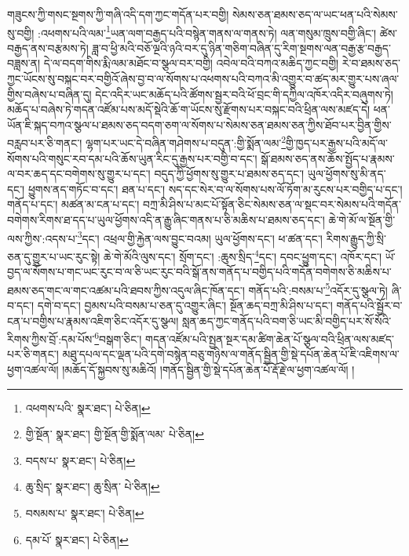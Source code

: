 གཟུངས་ཀྱི་གསང་སྔགས་ཀྱི་གཞི་འདི་དག་ཀྱང་གདོན་པར་བགྱི། སེམས་ཅན་ཐམས་ཅད་ལ་ཡང་ཕན་པའི་སེམས་སུ་བགྱི། :འཕགས་པའི་ལམ་\footnote{འཕགས་པའི་  སྣར་ཐང་།  པེ་ཅིན། }ཡན་ལག་བརྒྱད་པའི་བསྙེན་གནས་ལ་གནས་ཏེ། ལན་གསུམ་ཁྲུས་བགྱི་ཞིང་། ཚེས་བརྒྱད་ནས་བརྩམས་ཏེ། ཟླ་བ་ཕྱི་མའི་བཅོ་ལྔའི་ཉའི་བར་དུ་ཉིན་གཅིག་བཞིན་དུ་རིག་སྔགས་ལན་བརྒྱ་རྩ་བརྒྱད་བཟླས་ན། དེ་ལ་བདག་གིས་རྨི་ལམ་མཐོང་བ་སྩལ་བར་བགྱི། འབེལ་བའི་བཀའ་མཆིད་ཀྱང་བགྱི། རེ་བ་ཐམས་ཅད་ཀྱང་ཡོངས་སུ་བསྐང་བར་བགྱིའོ་ཞེས་བྱ་བ་ལ་སོགས་པ་འཕགས་པའི་བཀའ་མི་འགྱུར་བ་ཚད་མར་གྱུར་པས་ཞལ་གྱིས་བཞེས་པ་བཞིན་དུ། དེང་འདིར་ཡང་མཆོད་པའི་ཚོགས་སྦྱར་བའི་ཕོ་བྲང་གི་དཀྱིལ་འཁོར་འདིར་བཞུགས་ཏེ། མཆོད་པ་བཞེས་ཏེ་གདན་འཛོམ་པས་མདོ་སྡེའི་ཆོ་ག་ཡོངས་སུ་རྫོགས་པར་བསྐང་བའི་ཕྲིན་ལས་མཛད་དེ། ཕན་ཡོན་ཇི་སྐད་བཀའ་སྩལ་པ་ཐམས་ཅད་བདག་ཅག་ལ་སོགས་པ་སེམས་ཅན་ཐམས་ཅན་ཀྱིས་ཐོབ་པར་བྱིན་གྱིས་བརླབ་པར་ཅི་གནང་། ལྷག་པར་ཡང་དེ་བཞིན་གཤེགས་པ་བདུན་:གྱི་སྨོན་ལམ་\footnote{གྱི་སྔོན་  སྣར་ཐང་། གྱི་སྔོན་གྱི་སྨོན་ལམ་  པེ་ཅིན། }གྱི་ཁྱད་པར་རྒྱས་པའི་མདོ་ལ་སོགས་པའི་གསུང་རབ་དམ་པའི་ཆོས་ཡུན་རིང་དུ་རྒྱས་པར་བགྱི་བ་དང་། སྒོ་ཐམས་ཅད་ནས་ཆོས་སྤྱོད་པ་རྣམས་ལ་བར་ཆད་དང་བགེགས་སུ་གྱུར་པ་དང་། བདུད་ཀྱི་ཕྱོགས་སུ་གྱུར་པ་ཐམས་ཅད་དང་། ཡུལ་ཕྱོགས་སུ་མི་ནད་དང་། ཕྱུགས་ནད་གཏོང་བ་དང་། ཐན་པ་དང་། སད་དང་སེར་བ་ལ་སོགས་པས་ལོ་ཏོག་མ་རུངས་པར་བགྱིད་པ་དང་། གནོད་པ་དང་། མཚན་མ་ངན་པ་དང་། བཀྲ་མི་ཤིས་པ་མང་པོ་སྟོན་ཅིང་སེམས་ཅན་ལ་སྡང་བར་སེམས་པའི་གདོན་བགེགས་རིགས་ཐ་དད་པ་ཡུལ་ཕྱོགས་འདི་ན་རྒྱུ་ཞིང་གནས་པ་ཅི་མཆིས་པ་ཐམས་ཅད་དང་། ཆེ་གེ་མོ་ལ་སྔོན་གྱི་ལས་ཀྱིས་:འདས་པ་\footnote{བདས་པ་  སྣར་ཐང་།  པེ་ཅིན། }དང་། འཕྲལ་གྱི་རྐྱེན་ལས་བྱུང་བའམ། ཡུལ་ཕྱོགས་དང་། ཕ་ཚན་དང་། རིགས་རྒྱུད་ཀྱི་སྲི་ཅན་དུ་གྱུར་པ་ཡང་རུང་སྟེ། ཆེ་གེ་མོའི་ལུས་དང་། སྲོག་དང་། :ཆུས་སྲིད་\footnote{ཆུ་སྲིད་  སྣར་ཐང་། ཆུ་སྲིན་  པེ་ཅིན། }དང་། དབང་ཕྱུག་དང་། འཁོར་དང་། ཡོ་བྱད་ལ་སོགས་པ་གང་ཡང་རུང་བ་ལ་ཅི་ཡང་རུང་བའི་སྒོ་ནས་གནོད་པ་བགྱིད་པའི་གདོན་བགེགས་ཅི་མཆིས་པ་ཐམས་ཅད་གང་ལ་གང་འཚམ་པའི་ཐབས་ཀྱིས་འདུལ་ཞིང་ཁོན་དང་། གནོད་པའི་:བསམ་པ་\footnote{བསམས་པ་  སྣར་ཐང་།  པེ་ཅིན། }འདོར་དུ་སྩལ་ཏེ། ཞི་བ་དང་། དགེ་བ་དང་། བྱམས་པའི་བསམ་པ་ཅན་དུ་འགྱུར་ཞིང་། སྔོན་ཆད་བཀྲ་མི་ཤིས་པ་དང་། གནོད་པའི་སྦྱོར་བ་ངན་པ་བགྱིས་པ་རྣམས་འཇིག་ཅིང་འདོར་དུ་སྩལ། སླན་ཆད་ཀྱང་གནོད་པའི་བག་ཅི་ཡང་མི་བགྱིད་པར་སོ་སོའི་རིགས་ཀྱིས་བྲོ་:དམ་པོས་\footnote{དམ་པོ་  སྣར་ཐང་།  པེ་ཅིན། }བསྒག་ཅིང་། གདན་འཛོམ་པའི་སྤྱན་སྔར་དམ་ཚིག་ཆེན་པོ་སྩལ་བའི་ཕྲིན་ལས་མཛད་པར་ཅི་གནང་། མཐུ་དཔལ་དང་ལྡན་པའི་དགེ་བསྙེན་བཅུ་གཉིས་ལ་གནོད་སྦྱིན་གྱི་སྡེ་དཔོན་ཆེན་པོ་ཇི་འཇིགས་ལ་ཕྱག་འཚལ་ལོ། །མཆོད་དོ་སྐྱབས་སུ་མཆིའོ། །གནོད་སྦྱིན་གྱི་སྡེ་དཔོན་ཆེན་པོ་རྡོ་རྗེ་ལ་ཕྱག་འཚལ་ལོ། །
